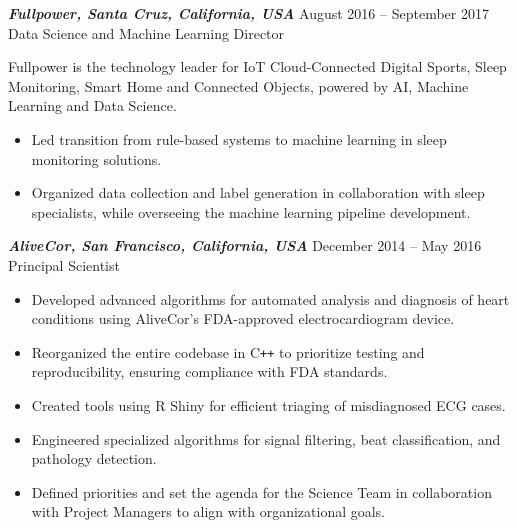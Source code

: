 \documentclass[10pt]{res} %
\begin{document}
\begin{resume}

{\sl \textbf{Fullpower, Santa Cruz, California, USA}} \hfill August 2016 -- September 2017 \\
Data Science and Machine Learning Director

\vspace{8pt}

Fullpower is the technology leader for IoT Cloud-Connected Digital
Sports, Sleep Monitoring, Smart Home and Connected Objects, powered by
AI, Machine Learning and Data Science.

\begin{itemize}
\item Led transition from rule-based systems to machine learning in
  sleep monitoring solutions.
  
\item Organized data collection and label generation in collaboration
  with sleep specialists, while overseeing the machine learning
  pipeline development.
  
\end{itemize}


{\sl \textbf{AliveCor, San Francisco, California, USA}} \hfill December 2014 -- May 2016 \\
Principal Scientist

\vspace{8pt}

\begin{itemize}
\item Developed advanced algorithms for automated analysis and
  diagnosis of heart conditions using AliveCor's FDA-approved
  electrocardiogram device.

\item Reorganized the entire codebase in C\texttt{++} to prioritize testing and
  reproducibility, ensuring compliance with FDA standards.

\item Created tools using R Shiny for efficient triaging of
  misdiagnosed ECG cases.

\item Engineered specialized algorithms for signal filtering, beat
  classification, and pathology detection.

\item Defined priorities and set the agenda for the Science Team in
  collaboration with Project Managers to align with organizational
  goals.
\end{itemize}


\end{resume}
\end{document}
